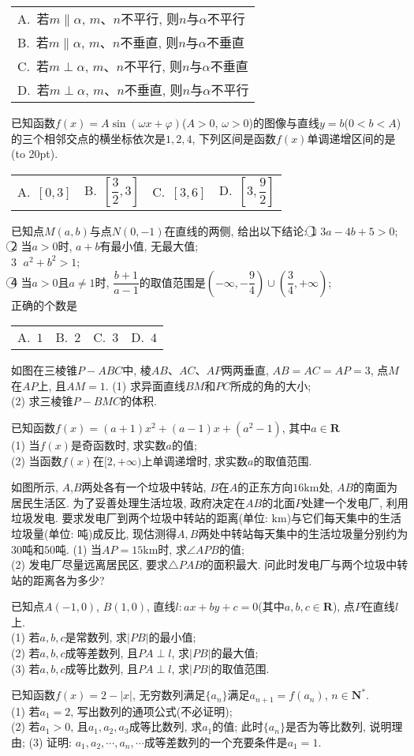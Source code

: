 \documentclass[10pt,a4paper]{article}
\newcommand{\bracket}[1]{(\hbox to #1pt{})}
\newcommand{\onech}[4]{\par\begin{tabular}{p{.9\textwidth}}
A.~#1\\
B.~#2\\
C.~#3\\
D.~#4
\end{tabular}}
\newcommand{\fourch}[4]{\par\begin{tabular}{p{.23\textwidth}p{.23\textwidth}p{.23\textwidth}p{.23\textwidth}}
A.~#1 &B.~#2& C.~#3& D.~#4
\end{tabular}}
\begin{document}
\onech{若$m\parallel \alpha$, $m$、$n$不平行, 则$n$与$\alpha$不平行}{若$m\parallel \alpha$, $m$、$n$不垂直, 则$n$与$\alpha$不垂直}{若$m\perp \alpha$, $m$、$n$不平行, 则$n$与$\alpha$不垂直}{若$m\perp \alpha$, $m$、$n$不垂直, 则$n$与$\alpha$不平行}
\item 已知函数$f(x)=A\sin(\omega x+\varphi)$($A>0$, $\omega>0$)的图像与直线$y=b$($0<b<A$)的三个相邻交点的横坐标依次是$1,2,4$, 下列区间是函数$f(x)$单调递增区间的是\bracket{20}.
\fourch{$[0,3]$}{$[\dfrac 32,3]$}{$[3,6]$}{$[3,\dfrac 92]$}
\item 已知点$M(a,b)$与点$N(0,-1)$在直线的两侧, 给出以下结论:
\textcircled{1} $3a-4b+5>0$;\\
\textcircled{2} 当$a>0$时, $a+b$有最小值, 无最大值;\\
\textcircled{3} $a^2+b^2>1$;\\
\textcircled{4} 当$a>0$且$a\ne 1$时, $\dfrac{b+1}{a-1}$的取值范围是$(-\infty,-\dfrac 94)\cup (\dfrac 34,+\infty)$;\\
正确的个数是
\fourch{$1$}{$2$}{$3$}{$4$}
\item 如图在三棱锥$P-ABC$中, 棱$AB$、$AC$、$AP$两两垂直, $AB=AC=AP=3$, 点$M$在$AP$上, 且$AM=1$.
(1) 求异面直线$BM$和$PC$所成的角的大小;\\
(2) 求三棱锥$P-BMC$的体积.
\item 已知函数$f(x)=(a+1)x^2+(a-1)x+(a^2-1)$, 其中$a\in \mathbf{R}$\\
(1) 当$f(x)$是奇函数时, 求实数$a$的值;\\
(2) 当函数$f(x)$在$[2,+\infty)$上单调递增时, 求实数$a$的取值范围.
\item 如图所示, $A$,$B$两处各有一个垃圾中转站, $B$在$A$的正东方向$16\text{km}$处, $AB$的南面为居民生活区. 为了妥善处理生活垃圾, 政府决定在$AB$的北面$P$处建一个发电厂, 利用垃圾发电. 要求发电厂到两个垃圾中转站的距离(单位: $\text{km}$)与它们每天集中的生活垃圾量(单位: 吨)成反比, 现估测得$A,B$两处中转站每天集中的生活垃圾量分别约为$30$吨和$50$吨.
(1) 当$AP=15\text{km}$时, 求$\angle APB$的值;\\
(2) 发电厂尽量远离居民区, 要求$\triangle PAB$的面积最大. 问此时发电厂与两个垃圾中转站的距离各为多少?
\item 已知点$A(-1,0)$, $B(1,0)$, 直线$l:ax+by+c=0$(其中$a,b,c\in \mathbf{R}$), 点$P$在直线$l$上.\\
(1) 若$a,b,c$是常数列, 求$|PB|$的最小值;\\
(2) 若$a,b,c$成等差数列, 且$PA\perp l$, 求$|PB|$的最大值;\\
(3) 若$a,b,c$成等比数列, 且$PA\perp l$, 求$|PB|$的取值范围.
\item 已知函数$f(x)=2-|x|$, 无穷数列满足$\{a_n\}$满足$a_{n+1}=f(a_n)$, $n\in \mathbf{N}^*$.\\
(1) 若$a_1=2$, 写出数列的通项公式(不必证明);\\
(2) 若$a_1>0$, 且$a_1,a_2,a_3$成等比数列, 求$a_1$的值; 此时$\{a_n\}$是否为等比数列, 说明理由;
(3) 证明: $a_1,a_2,\cdots,a_n,\cdots$成等差数列的一个充要条件是$a_1=1$.
\end{document}
